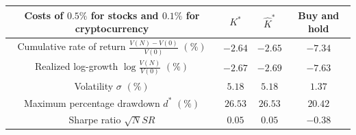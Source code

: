 \documentclass[10pt]{article} %
\begin{document}
\begin{table}[h!]
\begin{tabular}{|c|c|c|c|}
			\hline
			\hline
			\hline
			Costs of $0.5\%$ for stocks and $0.1\%$ for cryptocurrency &$K^*$ & $\widehat{K}^*$ & Buy and hold \\
			\hline
			Cumulative rate of return $\frac{V(N)-V(0)}{V(0)}$ $(\%)$ & $-2.64$ & $-2.65$ & $-7.34$  \\
			\hline
			Realized log-growth $\log\frac{V(N)}{V(0)}$ $(\%)$ & $-2.67$ & $-2.69$ & $-7.63$\\
			\hline
			Volatility $\sigma$ $(\%)$ & $5.18$ & $5.18$ & $1.37$ \\
			\hline
			Maximum percentage drawdown $d^*$ $(\%)$  & $26.53$ & $26.53$ & $20.42$ \\
			\hline
			Sharpe ratio $\sqrt{N}SR$ &  $0.05$ &  $0.05$ &  $-0.38$ \\
			\hline
			\hline
		\end{tabular}
		\label{table: Descriptive Statistics Daily cost (n=5)}
	\end{table}
	
	
\end{document}
